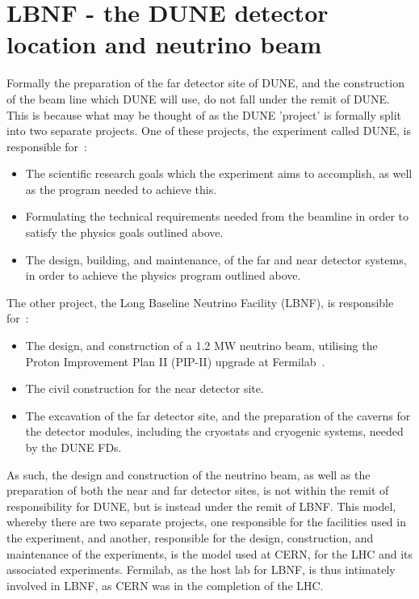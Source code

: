 \section{LBNF - the DUNE detector location and neutrino beam} \label{sec:DUNE_LBNF} %
Formally the preparation of the far detector site of DUNE, and the construction of the beam line which DUNE will use, do not fall under the remit of DUNE. This is because what may be thought of as the DUNE 'project' is formally split into two separate projects. One of these projects, the experiment called DUNE, is responsible for~\citep{DUNECDR_V1}:
\begin{itemize}
\item The scientific research goals which the experiment aims to accomplish, as well as the program needed to achieve this.
\item Formulating the technical requirements needed from the beamline in order to satisfy the physics goals outlined above.
\item The design, building, and maintenance, of the far and near detector systems, in order to achieve the physics program outlined above.  
\end{itemize}
The other project, the Long Baseline Neutrino Facility (LBNF), is responsible for~\citep{DUNECDR_V1}:
\begin{itemize}
\item The design, and construction of a 1.2 MW neutrino beam, utilising the Proton Improvement Plan II (PIP-II) upgrade at Fermilab~\citep{PIP-II}.
\item The civil construction for the near detector site.
\item The excavation of the far detector site, and the preparation of the caverns for the detector modules, including the cryostats and cryogenic systems, needed by the DUNE FDs.
\end{itemize}
As such, the design and construction of the neutrino beam, as well as the preparation of both the near and far detector sites, is not within the remit of responsibility for DUNE, but is instead under the remit of LBNF. This model, whereby there are two separate projects, one responsible for the facilities used in the experiment, and another, responsible for the design, construction, and maintenance of the experiments, is the model used at CERN, for the LHC and its associated experiments. Fermilab, as the host lab for LBNF, is thus intimately involved in LBNF, as CERN was in the completion of the LHC. \\

